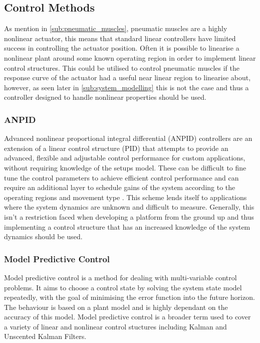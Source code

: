 \documentclass[11pt,a4paper]{article}
\begin{document}
\subsection{Control Methods}
\label{sub:control_methods}
As mention in \cref{sub:pneumatic_muscles}, pneumatic muscles are a highly nonlinear actuator, this means that standard linear controllers have limited success in controlling the actuator position. Often it is possible to linearise a nonlinear plant around some known operating region in order to implement linear control structures. This could be utilised to control pneumatic muscles if the response curve of the actuator had a useful near linear region to linearise about, however, as seen later in \cref{sub:system_modelling} this is not the case and thus a controller designed to handle nonlinear properties should be used. 

\subsubsection{ANPID}
\label{sub:pid}
Advanced nonlinear proportional integral differential (ANPID) controllers are an extension of a linear control structure (PID) that attempts to provide an advanced, flexible and adjustable control performance for custom applications, without requiring knowledge of the setups model. These can be difficult to fine tune the control parameters to achieve efficient control performance and can require an additional layer to schedule gains of the system according to the operating regions and movement type \cite{andrikopoulos_nikolakopoulos_2017}. This scheme lends itself to applications where the system dynamics are unknown and difficult to measure. Generally, this isn't a restriction faced when developing a platform from the ground up and thus implementing a control structure that has an increased knowledge of the system dynamics should be used.

\subsubsection{Model Predictive Control}
\label{sub:model_predictive_control}
Model predictive control is a method for dealing with multi-variable control problems. It aims to choose a control state by solving the system state model repeatedly, with the goal of minimising the error function into the future horizon. The behaviour is based on a plant model and is highly dependant on the accuracy of this model. Model predictive control is a broader term used to cover a variety of linear and nonlinear control stuctures including Kalman and Unscented Kalman Filters.
\end{document}
